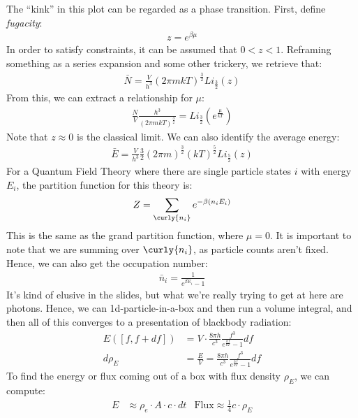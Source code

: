 \documentclass{article}
\begin{document}
The ``kink'' in this plot can be regarded as a phase transition.
\gap
{} First, define \textit{fugacity}:
\begin{align*}
  z = e^{\beta \mu}
\end{align*}
In order to satisfy constraints, it can be assumed that $0 < z < 1$. Reframing something as a series expansion and some other trickery, we retrieve that:
\begin{align*}
  \bar{N} = \frac{V}{h^3}(2\pi mkT)^\frac{3}{2}Li_\frac{3}{2}(z)
\end{align*}
From this, we can extract a relationship for $\mu$:
\begin{align*}
  \frac{N}{V}\frac{h^3}{(2\pi mkT)^\frac{3}{2}} = Li_\frac{3}{2}(e^{\frac{\mu}{kT}})
\end{align*}
Note that $z \approx 0$ is the classical limit.
\gap
We can also identify the average energy:
\begin{align*}
  \bar{E} = \frac{V}{h^3}\frac{3}{2}(2\pi m)^\frac{3}{2} (kT)^\frac{5}{2} Li_\frac{5}{2}(z)
\end{align*}
\vfill\pagebreak
{}
For a Quantum Field Theory where there are single particle states $i$ with energy $E_i$, the partition function for this theory is:
\begin{align*}
  Z = \sum_{\curly{n_i}}e^{-\beta(n_i E_i)}
\end{align*}
This is the same as the grand partition function, where $\mu = 0$. It is important to note that we are summing over $\curly{n_i}$, as particle counts aren't fixed. Hence, we can also get the occupation number:
\begin{align*}
  \bar{n}_i = \frac{1}{e^{\beta E_i} - 1}
\end{align*}
It's kind of elusive in the slides, but what we're really trying to get at here are photons. Hence, we can 1d-particle-in-a-box and then run a volume integral, and then all of this converges to a presentation of blackbody radiation:
\begin{align*}
  E\left([f, f + df]\right) &= V \cdot \frac{8\pi h}{c^3} \frac{f^3}{e^{\frac{hf}{kT}} - 1} df\\
  d\rho_E &= \frac{E}{V} = \frac{8\pi h}{c^3}\frac{f^3}{e^\frac{hf}{kT} - 1}df
\end{align*}
To find the energy or flux coming out of a box with flux density $\rho_E$, we can compute:
\begin{align*}
  E &\approx \rho_e \cdot A \cdot c \cdot dt & \text{Flux} \approx \frac{1}{4} c \cdot \rho_E
\end{align*}
\end{document}
